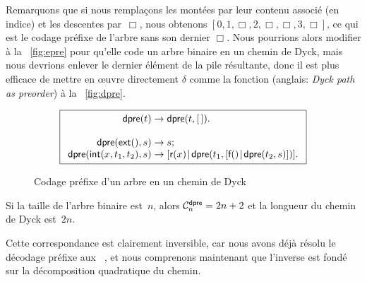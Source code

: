Remarquons que si nous remplaçons les montées par leur contenu associé
(en indice) et les descentes par~\(\Box\), nous obtenons \([0, 1,
\Box, 2, \Box, \Box, 3, \Box]\), ce qui est le codage
préfixe de l'arbre sans
son dernier \(\Box\). Nous pourrions alors modifier
 à la \fig~\vref{fig:epre} pour
qu'elle code un arbre binaire en un chemin de Dyck, mais nous devrions enlever le dernier élément de la pile
résultante, donc il est plus efficace de mettre en œuvre
directement \(\delta\) comme la fonction
 (anglais: \emph{Dyck path as
  preorder}) à la \fig~\vref{fig:dpre}.
\begin{figure}
\begin{equation*}
\boxed{
\begin{array}{r@{\;}c@{\;}l}
\fun{dpre}(t) & \rightarrow & \fun{dpre}(t,\el).\\
\\
\fun{dpre}(\fun{ext}(),s) & \rightarrow & s;\\
\fun{dpre}(\fun{int}(x,t_1,t_2),s)
  & \rightarrow
  & \cons{\fun{r}(x)}{\fun{dpre}(t_1,\cons{\fun{f}()}{\fun{dpre}(t_2,s)})}.
\end{array}}
\end{equation*}
\caption{Codage préfixe d'un arbre en un chemin de Dyck}
\label{fig:dpre}
\end{figure}
Si la taille de l'arbre binaire est~\(n\), alors \(\C{\fun{dpre}}{n} =
2n+2\) et la longueur du chemin de
Dyck est~\(2n\).

Cette correspondance est clairement inversible, car nous avons déjà
résolu le décodage préfixe aux
\figs~,
 et nous comprenons maintenant que
l'inverse est fondé sur la décomposition quadratique du
chemin.

